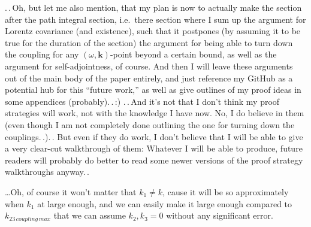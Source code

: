 \documentclass{report}
\begin{document}
.\,.\,Oh, but let me also mention, that my plan is now to actually make the section after the path integral section, i.e.\ there section where I sum up the argument for Lorentz covariance (and existence), such that it postpones (by assuming it to be true for the duration of the section) the argument for being able to turn down the coupling for any $(\omega, \boldsymbol{k})$-point beyond a certain bound, as well as the argument for self-adjointness, of course. And then I will leave these arguments out of the main body of the paper entirely, and just reference my GitHub as a potential hub for this ``future work,'' as well as give outlines of my proof ideas in some appendices (probably).\,.\,:) .\,.\,And it's not that I don't think my proof strategies will work, not with the knowledge I have now. No, I do believe in them (even though I am not completely done outlining the one for turning down the couplings.\,.).\,. But even if they do work, I don't believe that I will be able to give a very clear-cut walkthrough of them: Whatever I will be able to produce, future readers will probably do better to read some newer versions of the proof strategy walkthroughs anyway.\,. 

\ldots Oh, of course it won't matter that $k_1 \neq k$, cause it will be so approximately when $k_1$ at large enough, and we can easily make it large enough compared to $k_{23\,coupling\, max}$ that we can assume $k_2,k_3=0$ without any significant error. 
\end{document}

